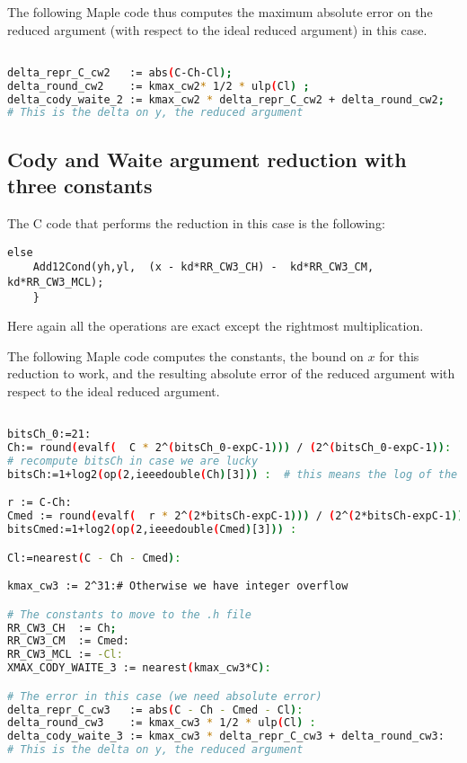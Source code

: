 The following Maple code thus computes the maximum absolute error on
the reduced argument (with respect to the ideal reduced argument) in
this case.
\begin{lstlisting}[caption={Computing constants for Cody and Waite 2},
  firstnumber=1,  language={sh}]% of course it's maple

delta_repr_C_cw2   := abs(C-Ch-Cl);
delta_round_cw2    := kmax_cw2* 1/2 * ulp(Cl) ;
delta_cody_waite_2 := kmax_cw2 * delta_repr_C_cw2 + delta_round_cw2;
# This is the delta on y, the reduced argument
\end{lstlisting}


\subsection{Cody and Waite argument reduction with three constants}
The C code that performs the reduction in this case is the following:

\begin{lstlisting}[caption={Cody and Waite argument reduction with three 
    constants},firstnumber=1]
      else 
	Add12Cond(yh,yl,  (x - kd*RR_CW3_CH) -  kd*RR_CW3_CM,   kd*RR_CW3_MCL);
    }
\end{lstlisting}

Here again all the operations are exact except the rightmost multiplication. 

The following Maple code computes the constants, the bound on $x$ for
this reduction to work, and the resulting absolute error of the reduced
argument with respect to the ideal reduced argument.

\begin{lstlisting}[caption={Computing constants for Cody and Waite 3},
  firstnumber=1,  language={sh}]% of course it's maple
%Skip a line here, I don't know why, otherwise latex eats the first line

bitsCh_0:=21:
Ch:= round(evalf(  C * 2^(bitsCh_0-expC-1))) / (2^(bitsCh_0-expC-1)):
# recompute bitsCh in case we are lucky
bitsCh:=1+log2(op(2,ieeedouble(Ch)[3])) :  # this means the log of the denominator

r := C-Ch:
Cmed := round(evalf(  r * 2^(2*bitsCh-expC-1))) / (2^(2*bitsCh-expC-1)):
bitsCmed:=1+log2(op(2,ieeedouble(Cmed)[3])) :

Cl:=nearest(C - Ch - Cmed):

kmax_cw3 := 2^31:# Otherwise we have integer overflow

# The constants to move to the .h file
RR_CW3_CH  := Ch;
RR_CW3_CM  := Cmed:
RR_CW3_MCL := -Cl:
XMAX_CODY_WAITE_3 := nearest(kmax_cw3*C):

# The error in this case (we need absolute error)
delta_repr_C_cw3   := abs(C - Ch - Cmed - Cl):
delta_round_cw3    := kmax_cw3 * 1/2 * ulp(Cl) :
delta_cody_waite_3 := kmax_cw3 * delta_repr_C_cw3 + delta_round_cw3:
# This is the delta on y, the reduced argument
\end{lstlisting}

